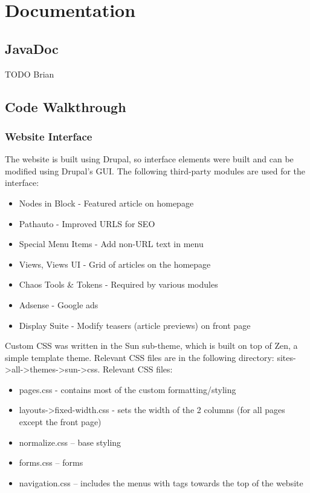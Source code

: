 \documentclass[11pt]{article} %
\begin{document}
\section{Documentation}

\subsection{JavaDoc}

TODO Brian

\subsection{Code Walkthrough}

\subsubsection{Website Interface}

The website is built using Drupal, so interface elements were built and can be modified using Drupal’s GUI. The following third-party modules are used for the interface:

\begin{itemize}
\item Nodes in Block - Featured article on homepage
\item Pathauto - Improved URLS for SEO
\item Special Menu Items - Add non-URL text in menu
\item Views, Views UI - Grid of articles on the homepage
\item Chaos Tools \& Tokens - Required by various modules
\item Adsense - Google ads
\item Display Suite - Modify teasers (article previews) on front page
\end{itemize}

Custom CSS was written in the Sun sub-theme, which is built on top of Zen, a simple template theme. Relevant CSS files are in the following directory: sites-\textgreater all-\textgreater themes-\textgreater sun-\textgreater css.
Relevant CSS files:

\begin{itemize}
\item pages.css - contains most of the custom formatting/styling
\item layouts-\textgreater fixed-width.css - sets the width of the 2 columns (for all pages except the front page)
\item normalize.css – base styling
\item forms.css – forms
\item navigation.css – includes the menus with tags towards the top of the website
\end{itemize}
\end{document}
